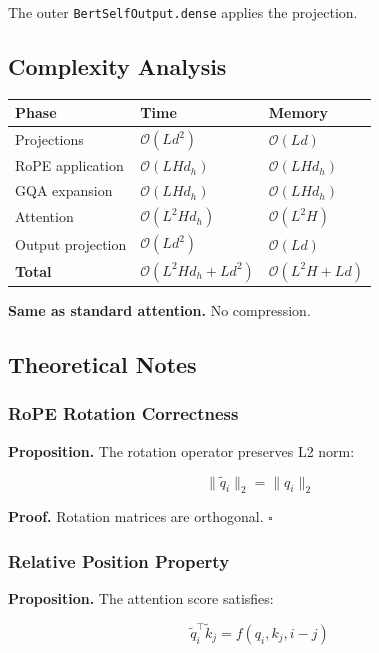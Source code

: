 {The outer \texttt{BertSelfOutput.dense} applies the projection.

\subsection{Complexity Analysis}

\begin{table}[H]
\centering
\small
\begin{tabular}{lll}
\toprule
\textbf{Phase} & \textbf{Time} & \textbf{Memory} \\
\midrule
Projections & $\mathcal{O}(L d^2)$ & $\mathcal{O}(L d)$ \\
RoPE application & $\mathcal{O}(L H d_h)$ & $\mathcal{O}(L H d_h)$ \\
GQA expansion & $\mathcal{O}(L H d_h)$ & $\mathcal{O}(L H d_h)$ \\
Attention & $\mathcal{O}(L^2 H d_h)$ & $\mathcal{O}(L^2 H)$ \\
Output projection & $\mathcal{O}(L d^2)$ & $\mathcal{O}(L d)$ \\
\textbf{Total} & $\mathcal{O}(L^2 H d_h + L d^2)$ & $\mathcal{O}(L^2 H + L d)$ \\
\bottomrule
\end{tabular}
\end{table}

\textbf{Same as standard attention.} No compression.

\subsection{Theoretical Notes}

\subsubsection{RoPE Rotation Correctness}

\textbf{Proposition.} The rotation operator preserves L2 norm:

\[
\|\tilde{q}_i\|_2 = \|q_i\|_2
\tag{4.1}
\]

\textbf{Proof.} Rotation matrices are orthogonal. $\square$

\subsubsection{Relative Position Property}

\textbf{Proposition.} The attention score satisfies:

\[
\tilde{q}_i^\top \tilde{k}_j = f(q_i, k_j, i - j)
\tag{4.2}
\]

}
